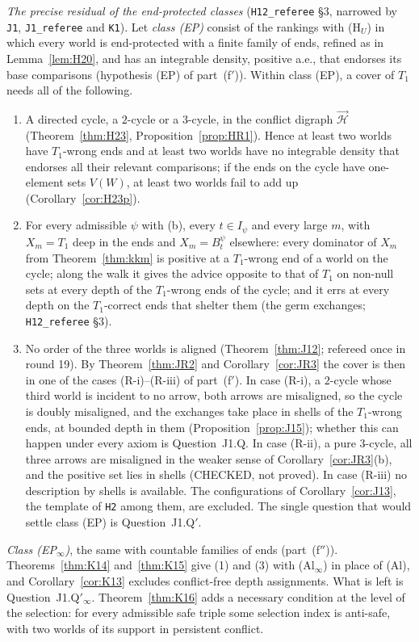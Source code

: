 \documentclass[11pt]{article}
\theoremstyle{definition}
\theoremstyle{remark}
\newcommand{\src}[1]{\texttt{#1}}
\begin{document}
\emph{The precise residual of the end-protected classes} (\src{H12\_referee} \S3, narrowed by \src{J1}, \src{J1\_referee} and \src{K1}). Let \emph{class (EP)} consist of the rankings with (H$_U$) in which every world is end-protected with a finite family of ends, refined as in Lemma~\ref{lem:H20}, and has an integrable density, positive a.e., that endorses its base comparisons (hypothesis (EP) of part~(f$'$)). Within class (EP), a cover of $T_1$ needs all of the following.
\begin{enumerate}[leftmargin=*,label=(\arabic*)]
\item A directed cycle, a $2$-cycle or a $3$-cycle, in the conflict digraph $\vec{\mathcal H}$ (Theorem~\ref{thm:H23}, Proposition~\ref{prop:HR1}). Hence at least two worlds have $T_1$-wrong ends and at least two worlds have no integrable density that endorses all their relevant comparisons; if the ends on the cycle have one-element sets $V(W)$, at least two worlds fail to add up (Corollary~\ref{cor:H23p}).
\item For every admissible $\psi$ with (b), every $t\in I_\psi$ and every large $m$, with $X_m=T_1$ deep in the ends and $X_m=B^\psi_t$ elsewhere: every dominator of $X_m$ from Theorem~\ref{thm:kkm} is positive at a $T_1$-wrong end of a world on the cycle; along the walk it gives the advice opposite to that of $T_1$ on non-null sets at every depth of the $T_1$-wrong ends of the cycle; and it errs at every depth on the $T_1$-correct ends that shelter them (the germ exchanges; \src{H12\_referee} \S3).
\item No order of the three worlds is aligned (Theorem~\ref{thm:J12}; refereed once in round 19). By Theorem~\ref{thm:JR2} and Corollary~\ref{cor:JR3} the cover is then in one of the cases (R-i)--(R-iii) of part~(f$'$). In case (R-i), a $2$-cycle whose third world is incident to no arrow, both arrows are misaligned, so the cycle is doubly misaligned, and the exchanges take place in shells of the $T_1$-wrong ends, at bounded depth in them (Proposition~\ref{prop:J15}); whether this can happen under every axiom is Question~J1.Q. In case (R-ii), a pure $3$-cycle, all three arrows are misaligned in the weaker sense of Corollary~\ref{cor:JR3}(b), and the positive set lies in shells (CHECKED, not proved). In case (R-iii) no description by shells is available. The configurations of Corollary~\ref{cor:J13}, the template of \src{H2} among them, are excluded. The single question that would settle class (EP) is Question~J1.Q$'$.
\end{enumerate}
\emph{Class (EP$_\infty$)}, the same with countable families of ends (part~(f$''$)). Theorems~\ref{thm:K14} and~\ref{thm:K15} give (1) and (3) with (Al$_\infty$) in place of (Al), and Corollary~\ref{cor:K13} excludes conflict-free depth assignments. What is left is Question~J1.Q$'_\infty$. Theorem~\ref{thm:K16} adds a necessary condition at the level of the selection: for every admissible safe triple some selection index is anti-safe, with two worlds of its support in persistent conflict.
\end{document}
